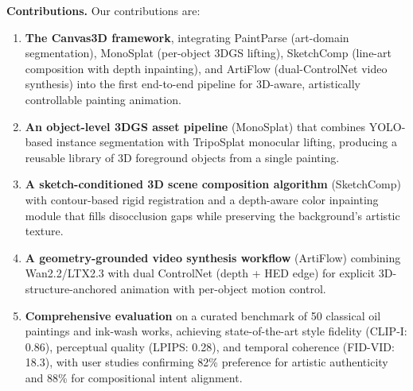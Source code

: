 \smallskip
\noindent\textbf{Contributions.} Our contributions are:
\begin{enumerate}
    \item \textbf{The Canvas3D framework}, integrating PaintParse (art-domain
    segmentation), MonoSplat (per-object 3DGS lifting), SketchComp (line-art
    composition with depth inpainting), and ArtiFlow (dual-ControlNet video
    synthesis) into the first end-to-end pipeline for 3D-aware, artistically
    controllable painting animation.
    \item \textbf{An object-level 3DGS asset pipeline} (MonoSplat) that combines
    YOLO-based instance segmentation with TripoSplat monocular lifting,
    producing a reusable library of 3D foreground objects from a single
    painting.
    \item \textbf{A sketch-conditioned 3D scene composition algorithm}
    (SketchComp) with contour-based rigid registration and a depth-aware color
    inpainting module that fills disocclusion gaps while preserving the
    background's artistic texture.
    \item \textbf{A geometry-grounded video synthesis workflow} (ArtiFlow)
    combining Wan2.2/LTX2.3 with dual ControlNet (depth + HED edge) for
    explicit 3D-structure-anchored animation with per-object motion control.
    \item \textbf{Comprehensive evaluation} on a curated benchmark of 50
    classical oil paintings and ink-wash works, achieving state-of-the-art
    style fidelity (CLIP-I: 0.86), perceptual quality (LPIPS: 0.28), and
    temporal coherence (FID-VID: 18.3), with user studies confirming 82\%
    preference for artistic authenticity and 88\% for compositional intent
    alignment.
\end{enumerate}
